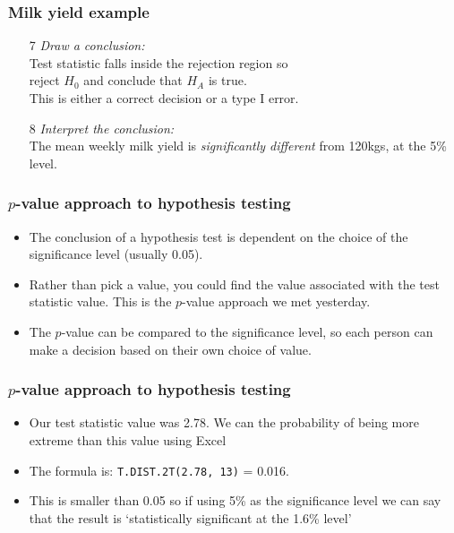 \documentclass[12pt,xcolor=dvipsnames,handout,mathserif,aspectratio=169]{beamer}
\begin{document}
\begin{frame}\frametitle{Milk yield example}
\begin{enumerate}
\item[7] \emph{Draw a conclusion:}\\
\vspace{0.5cm}
Test statistic falls inside the rejection region so\\ reject $H_0$ and conclude that $H_A$ is true. \\
\vspace{0.5cm}This is either a correct decision or a type I error. 
 \vspace*{0.5cm}
\item[8] \emph{Interpret the conclusion:}\\
\vspace{0.5cm}
The mean weekly milk yield is \emph{significantly different} from 120kgs, at the 5\% level.
    \end{enumerate}
\end{frame}

\begin{frame}
\frametitle{$p$-value approach to hypothesis testing}
\begin{itemize}
\item The conclusion of a hypothesis test is dependent on the choice of the significance level (usually 0.05).
\item Rather than pick a value, you could find the value associated with the test statistic value. This is the $p$-value approach we met yesterday.
\item The $p$-value can be compared to the significance level, so each person can make a decision based on their own choice of value.
\end{itemize}
\end{frame}

\begin{frame}
\frametitle{$p$-value approach to hypothesis testing}
\begin{itemize}
\item Our test statistic value was 2.78. We can the probability of being more extreme than this value using Excel
\item The formula is: 	\texttt{T.DIST.2T(2.78, 13)} = 0.016.
\item This is smaller than 0.05 so if using 5\% as the significance level we can say that the result is `statistically significant at the 1.6\% level'
\end{itemize}
\end{frame}
\end{document}

